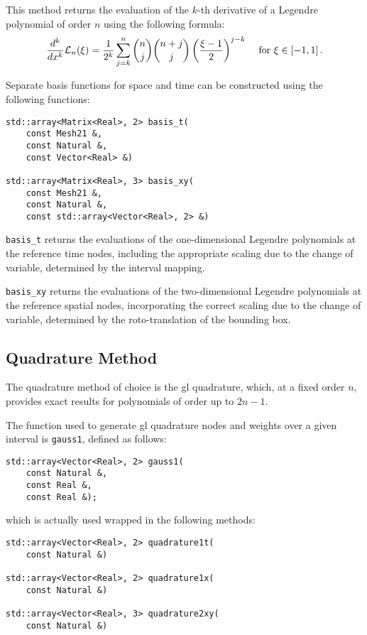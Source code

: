 This method returns the evaluation of the $k$-th derivative of a Legendre polynomial of order $n$ using the following formula:
\begin{align}
    \frac{d^k}{dx^k} \mathcal{L}_n(\xi) &= \frac{1}{2^k} \sum_{j = k}^{n} \binom{n}{j} \binom{n + j}{j} \left( \frac{\xi - 1}{2} \right)^{j - k} &\text{ for } \xi \in \left[ -1, 1 \right].
\end{align}

Separate basis functions for space and time can be constructed using the following functions:
\begin{lstlisting}[style=cpp]
std::array<Matrix<Real>, 2> basis_t(
    const Mesh21 &, 
    const Natural &, 
    const Vector<Real> &)

std::array<Matrix<Real>, 3> basis_xy(
    const Mesh21 &, 
    const Natural &, 
    const std::array<Vector<Real>, 2> &)
\end{lstlisting}

\lstinline{basis_t} returns the evaluations of the one-dimensional Legendre polynomials at the reference time nodes, including the appropriate scaling due to the change of variable, determined by the interval mapping.

\lstinline{basis_xy} returns the evaluations of the two-dimensional Legendre polynomials at the reference spatial nodes, incorporating the correct scaling due to the change of variable, determined by the roto-translation of the bounding box.

\newpage
\subsection{Quadrature Method} \label{subsection:quadrature}

The quadrature method of choice is the \acrfull{gl} quadrature, which, at a fixed order $n$, provides exact results for polynomials of order up to $2n - 1$.

The function used to generate \acrshort{gl} quadrature nodes and weights over a given interval is \lstinline{gauss1}, defined as follows:
\begin{lstlisting}[style=cpp]
std::array<Vector<Real>, 2> gauss1(
    const Natural &, 
    const Real &, 
    const Real &);
\end{lstlisting}
which is actually used wrapped in the following methods:
\begin{lstlisting}[style=cpp]
std::array<Vector<Real>, 2> quadrature1t(
    const Natural &)

std::array<Vector<Real>, 2> quadrature1x(
    const Natural &)

std::array<Vector<Real>, 3> quadrature2xy(
    const Natural &)
\end{lstlisting}


